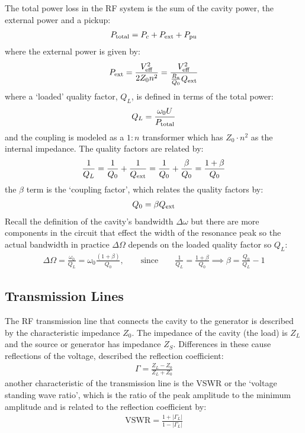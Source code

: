 \documentclass{article}
\numberwithin{equation}{section}
\begin{document}
The total power loss in the RF system is the sum of the cavity power, the external power and a pickup:
\begin{align}
P_{\rm total}= P_{c} + P_{\rm ext} + P_{\rm pu}
\end{align}
where the external power is given by:
\begin{align}
P_{\rm ext} = \frac{V_{\rm eff}^2}{2 Z_0 n^2 } = \frac{V_{\rm eff}^2}{ \frac{R_a}{Q_0} Q_{\rm ext} }
\end{align}
where a `loaded' quality factor, $Q_L$, is defined in terms of the total power:
\begin{align}
Q_L = \frac{\omega_0 U}{P_{\rm total}}
\end{align}
and the coupling is modeled as a $1:n$ transformer which has $Z_0 \cdot n^2$ as the internal impedance.
The quality factors are related by:
\begin{align}
\frac{1}{Q_L} = \frac{1}{Q_0} + \frac{1}{Q_{\rm ext}} = \frac{1}{Q_0} + \frac{\beta}{Q_0} = \frac{1+\beta}{Q_0}
\end{align}
the $\beta$ term is the `coupling factor', which relates the quality factors by:
\begin{align}
Q_0 = \beta Q_{\rm ext}
\end{align}
Recall the definition of the cavity's bandwidth $\Delta \omega$ but there are more components in the circuit that effect the width of the resonance peak so the actual bandwidth in practice $\Delta \Omega$ depends on the loaded quality factor so $Q_L$:
\begin{align}
\Delta \Omega = \frac{\omega_0}{Q_L} = \omega_0 \frac{(1+\beta)}{Q_0} ,\qquad
\text{since} \qquad 
\frac{1}{Q_L} = \frac{1+\beta}{Q_0} \implies \beta = \frac{Q_0}{Q_L} -1
\end{align}


\subsection{ Transmission Lines }
The RF transmission line that connects the cavity to the generator is described by the characteristic impedance $Z_0$. The impedance of the cavity (the load) is $Z_L$ and the source or generator has impedance $Z_S$. Differences in these cause reflections of the voltage, described the reflection coefficient:
\begin{align}
\Gamma = \frac{Z_L - Z_0 }{Z_L + Z_0}
\end{align}
another characteristic of the transmission line is the VSWR or the `voltage standing wave ratio', which is the ratio of the peak amplitude to the minimum amplitude and is related to the reflection coefficient by: 
\begin{align}
\text{VSWR} = \frac{1+|\Gamma_L|}{1-|\Gamma_L|}
\end{align}
\end{document}

